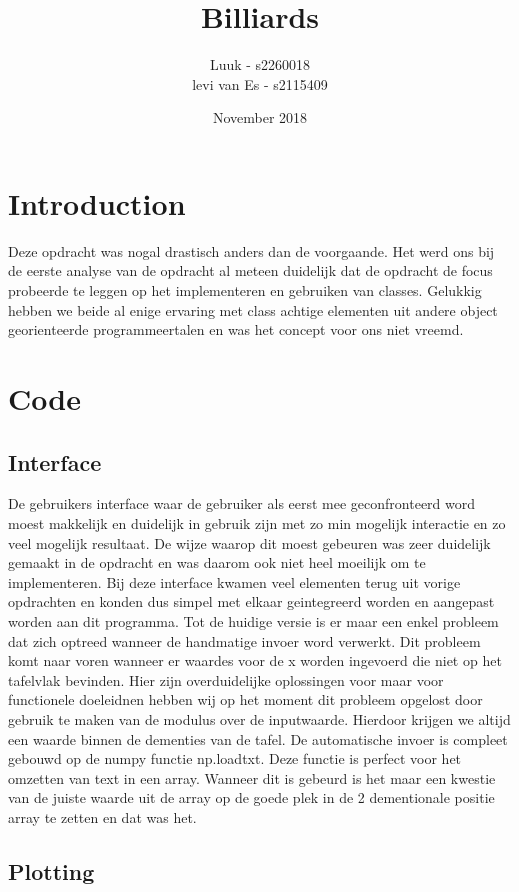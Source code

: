 \documentclass{article}
\title{Billiards}
\author{Luuk - s2260018\\levi van Es - s2115409 }
\date{November 2018}
\begin{document}
\maketitle

\section{Introduction}
    Deze opdracht was nogal drastisch anders dan de voorgaande. Het werd ons bij de eerste analyse van de opdracht al meteen duidelijk dat de opdracht de focus probeerde te leggen op het implementeren en gebruiken van classes. Gelukkig hebben we beide al enige ervaring met class achtige elementen uit andere object georienteerde programmeertalen en was het concept voor ons niet vreemd. 
    
\section{Code}
\subsection{Interface}
De gebruikers interface waar de gebruiker als eerst mee geconfronteerd word moest makkelijk en duidelijk in gebruik zijn met zo min mogelijk interactie en zo veel mogelijk resultaat. De wijze waarop dit moest gebeuren was zeer duidelijk gemaakt in de opdracht en was daarom ook niet heel moeilijk om te implementeren. Bij deze interface kwamen veel elementen terug uit vorige opdrachten en konden dus simpel met elkaar geintegreerd worden en aangepast worden aan dit programma. \newline Tot de huidige versie is er maar een enkel probleem dat zich optreed wanneer de handmatige invoer word verwerkt. Dit probleem komt naar voren wanneer er waardes voor de x worden ingevoerd die niet op het tafelvlak bevinden. Hier zijn overduidelijke oplossingen voor maar voor functionele doeleidnen hebben wij op het moment dit probleem opgelost door gebruik te maken van de modulus over de inputwaarde. Hierdoor krijgen we altijd een waarde binnen de dementies van de tafel. \newline De automatische invoer is compleet gebouwd op de numpy functie np.loadtxt. Deze functie is perfect voor het omzetten van text in een array. Wanneer dit is gebeurd is het maar een kwestie van de juiste waarde uit de array op de goede plek in de 2 dementionale positie array te zetten en dat was het.
\subsection{Plotting}
\end{document}
